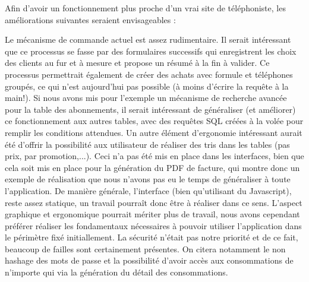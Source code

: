 Afin d'avoir un fonctionnement plus proche d'un vrai site de téléphoniste, les améliorations suivantes seraient envisageables :
\begin{itemize}
  Le mécanisme de commande actuel est assez rudimentaire. Il serait intéressant que ce processus se fasse par des formulaires successifs qui enregistrent les choix des clients au fur et à mesure et propose un résumé à la fin à valider. Ce processus permettrait également de créer des achats avec formule et téléphones groupés, ce qui n'est aujourd'hui pas possible (à moins d'écrire la requête à la main!).
  Si nous avons mis pour l'exemple un mécanisme de recherche avancée pour la table des abonnements, il serait intéressant de généraliser (et améliorer) ce fonctionnement aux autres tables, avec des requêtes SQL créées à la volée pour remplir les conditions attendues.
  Un autre élément d'ergonomie intéressant aurait été d'offrir la possibilité aux utilisateur de réaliser des tris dans les tables (pas prix, par promotion,...). Ceci n'a pas été mis en place dans les interfaces, bien que cela soit mis en place pour la génération du PDF de facture, qui montre donc un exemple de réalisation que nous n'avons pas eu le temps de généraliser à toute l'application.
  De manière générale, l'interface (bien qu'utilisant du Javascript), reste assez statique, un travail pourraît donc être à réaliser dans ce sens. L'aspect graphique et ergonomique pourrait mériter plus de travail, nous avons cependant préférer réaliser les fondamentaux nécessaires à pouvoir utiliser l'application dans le périmètre fixé initiallement.
	 La sécurité n'était pas notre priorité et de ce fait, beaucoup de failles sont certainement présentes. On citera notamment le non hashage des mots de passe et la possibilité d'avoir accès aux consommations de n'importe qui via la génération du détail des consommations.
\end{itemize}



